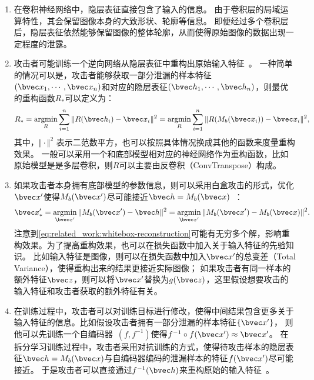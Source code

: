 \begin{enumerate}
    \item 在卷积神经网络中，隐层表征直接包含了输入的信息\cite{abuadbba2020can_split}。
    由于卷积层的局域运算特性，其会保留图像本身的大致形状、轮廓等信息。
    即便经过多个卷积层后，隐层表征依然能够保留图像的整体轮廓，从而使得原始图像的数据出现一定程度的泄露。
    \item 攻击者可能训练一个逆向网络从隐层表征中重构出原始输入特征~\cite{vepakomma2020nopeek,hezecheng_2019_model_inversion_attack}。
    一种简单的情况可以是，攻击者能够获取一部分泄漏的样本特征$(\bvec x_1, \cdots, \bvec x_n)$和对应的隐层表征$(\bvec h_1, \cdots, \bvec h_n)$，则最优的重构函数$R_*$可以定义为：
    \begin{equation}
        R_* = \mathop{\text{argmin}}_{R} \sum_{i=1}^n \Vert R(\bvec h_i) - \bvec x_i\Vert^2 = 
        \mathop{\text{argmin}}_{R} \sum_{i=1}^n \Vert R(M_b(\bvec x_i)) - \bvec x_i\Vert^2,
    \end{equation}
    其中，$\Vert \cdot\Vert^2$ 表示二范数平方，也可以按照具体情况换成其他的函数来度量重构效果。
    一般可以采用一个和底部模型相对应的神经网络作为重构函数，比如原始模型是是多层卷积，则$R$可以主要由反卷积（ConvTranspose）构成。
    \item 如果攻击者本身拥有底部模型的参数信息，则可以采用白盒攻击的形式，优化$\bvec x'$使得$M_b(\bvec x')$尽可能接近$\bvec h = M_b(\bvec x)$~\cite{hezecheng_2019_model_inversion_attack,luoxinjian2021feature_attack}：
    \begin{equation}
    \label{eq:related_work:whitebox-reconstruction}
        \bvec x'_* = \mathop{\text{argmin}}_{\bvec x'} \Vert M_b(\bvec x') - \bvec h\Vert^2 = \mathop{\text{argmin}}_{\bvec x'} \Vert M_b(\bvec x') - M_b(\bvec x)\Vert^2.
    \end{equation}
    注意到\autoref{eq:related_work:whitebox-reconstruction}可能有无穷多个解，影响重构效果。为了提高重构效果，也可以在损失函数中加入关于输入特征的先验知识。
    比如输入特征是图像，则可以在损失函数中加入$\bvec x'$的总变差（Total Variance），使得重构出来的结果更接近实际图像；
    如果攻击者有同一样本的额外特征$\bvec z$，则可以将$\bvec x'$替换为$g(\bvec z)$，这里假设想要攻击的输入特征和攻击者获取的额外特征有关。
    \item 在训练过程中，攻击者可以对训练目标进行修改，使得中间结果包含更多关于输入特征的信息。比如假设攻击者拥有一部分泄漏的样本特征$\{ \bvec x' \}$，
    则他可以先训练一个自编码器~\cite{kramer1991autoencoder,baldi2012autoencoders}$(f,f^{-1})$使得$f^{-1}\circ f(\bvec x')\approx \bvec x'$。
    在拆分学习训练过程中，攻击者采用对抗训练的方式，使得待攻击样本的隐层表征$\bvec h = M_b(\bvec x)$与自编码器编码的泄漏样本的特征$f(\bvec x')$尽可能接近。
    于是攻击者可以直接通过$f^{-1}(\bvec h)$来重构原始的输入特征~\cite{pasquini2921inference_attack_tiger}。
\end{enumerate}

